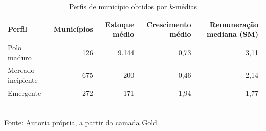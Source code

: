 \begin{table}[htbp]
    \centering
    \caption{Perfis de município obtidos por $k$-médias}
    \label{tab:clusters}
    \footnotesize
    \renewcommand{\arraystretch}{1.25}
    \begin{tabular}{lrrrr}
        \toprule
        \rowcolor{black!8}
        \textbf{Perfil} & \textbf{Municípios} & \textbf{Estoque médio} & \textbf{Crescimento médio} & \textbf{Remuneração mediana (SM)} \\
        \midrule
        Polo maduro & 126 & 9.144 & 0,73 & 3,11 \\
        Mercado incipiente & 675 & 200 & 0,46 & 2,14 \\
        Emergente & 272 & 171 & 1,94 & 1,77 \\
        \bottomrule
    \end{tabular}
    \\[4pt]
    Fonte: Autoria própria, a partir da camada Gold.
\end{table}
